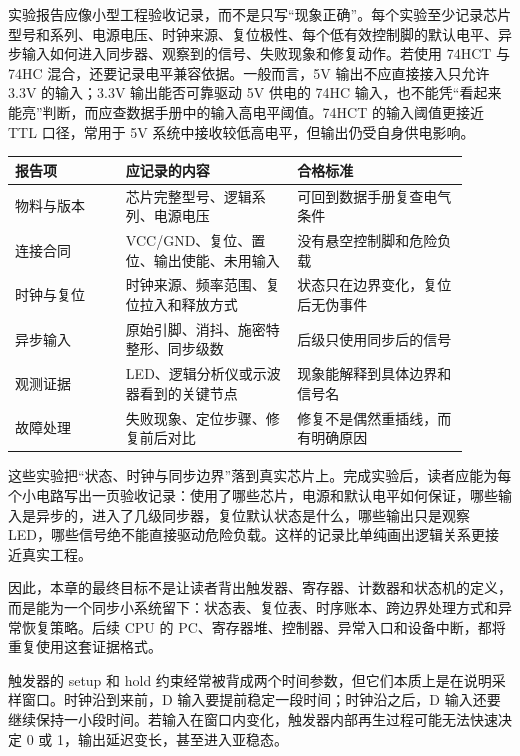 实验报告应像小型工程验收记录，而不是只写“现象正确”。每个实验至少记录芯片型号和系列、电源电压、时钟来源、复位极性、每个低有效控制脚的默认电平、异步输入如何进入同步器、观察到的信号、失败现象和修复动作。若使用 74HCT 与 74HC 混合，还要记录电平兼容依据。一般而言，5V 输出不应直接接入只允许 3.3V 的输入；3.3V 输出能否可靠驱动 5V 供电的 74HC 输入，也不能凭“看起来能亮”判断，而应查数据手册中的输入高电平阈值。74HCT 的输入阈值更接近 TTL 口径，常用于 5V 系统中接收较低高电平，但输出仍受自身供电影响。

\begin{longtable}{L{0.22\linewidth}L{0.34\linewidth}L{0.34\linewidth}}
\toprule
报告项 & 应记录的内容 & 合格标准 \\
\midrule
物料与版本 & 芯片完整型号、逻辑系列、电源电压 & 可回到数据手册复查电气条件 \\
连接合同 & VCC/GND、复位、置位、输出使能、未用输入 & 没有悬空控制脚和危险负载 \\
时钟与复位 & 时钟来源、频率范围、复位拉入和释放方式 & 状态只在边界变化，复位后无伪事件 \\
异步输入 & 原始引脚、消抖、施密特整形、同步级数 & 后级只使用同步后的信号 \\
观测证据 & LED、逻辑分析仪或示波器看到的关键节点 & 现象能解释到具体边界和信号名 \\
故障处理 & 失败现象、定位步骤、修复前后对比 & 修复不是偶然重插线，而有明确原因 \\
\bottomrule
\end{longtable}

这些实验把“状态、时钟与同步边界”落到真实芯片上。完成实验后，读者应能为每个小电路写出一页验收记录：使用了哪些芯片，电源和默认电平如何保证，哪些输入是异步的，进入了几级同步器，复位默认状态是什么，哪些输出只是观察 LED，哪些信号绝不能直接驱动危险负载。这样的记录比单纯画出逻辑关系更接近真实工程。

因此，本章的最终目标不是让读者背出触发器、寄存器、计数器和状态机的定义，而是能为一个同步小系统留下：状态表、复位表、时序账本、跨边界处理方式和异常恢复策略。后续 CPU 的 PC、寄存器堆、控制器、异常入口和设备中断，都将重复使用这套证据格式。

触发器的 setup 和 hold 约束经常被背成两个时间参数，但它们本质上是在说明采样窗口。时钟沿到来前，D 输入要提前稳定一段时间；时钟沿之后，D 输入还要继续保持一小段时间。若输入在窗口内变化，触发器内部再生过程可能无法快速决定 0 或 1，输出延迟变长，甚至进入亚稳态。

